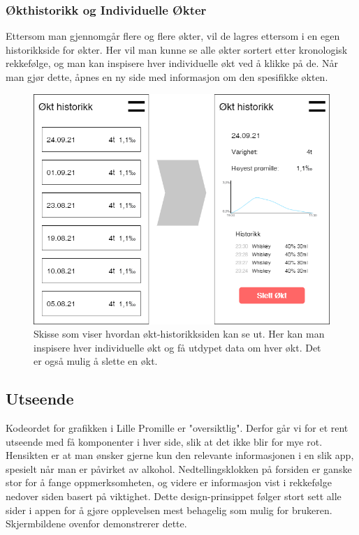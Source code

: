 \subsubsection{Økthistorikk og Individuelle Økter}
Ettersom man gjennomgår flere og flere økter, vil de lagres ettersom i en egen historikkside for økter. Her vil man kunne se alle økter sortert etter kronologisk rekkefølge, og man kan inspisere hver individuelle økt ved å klikke på de. Når man gjør dette, åpnes en ny side med informasjon om den spesifikke økten.

\begin{figure}[H]
    \centering
    \includegraphics[scale=0.4]{images/lille_promille_sessions.drawio.png}
    \caption{Skisse som viser hvordan økt-historikksiden kan se ut. Her kan man inspisere hver individuelle økt og få utdypet data om hver økt. Det er også mulig å slette en økt.}
\end{figure}

\subsection{Utseende}
Kodeordet for grafikken i Lille Promille er "oversiktlig". Derfor går vi for et rent utseende med få komponenter i hver side, slik at det ikke blir for mye rot. Hensikten er at man ønsker gjerne kun den relevante informasjonen i en slik app, spesielt når man er påvirket av alkohol. Nedtellingsklokken på forsiden er ganske stor for å fange oppmerksomheten, og videre er informasjon vist i rekkefølge nedover siden basert på viktighet. Dette design-prinsippet følger stort sett alle sider i appen for å gjøre opplevelsen mest behagelig som mulig for brukeren. Skjermbildene ovenfor demonstrerer dette.

